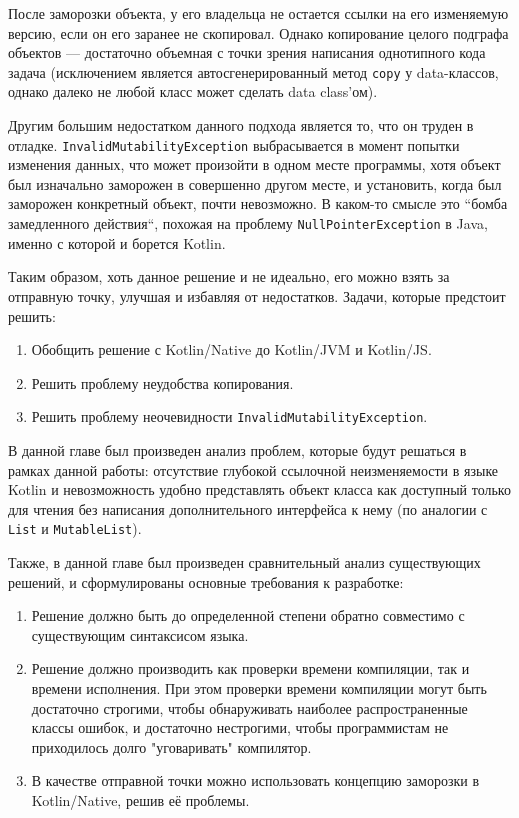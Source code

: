 \documentclass[specification,annotation,times]{itmo-student-thesis}
\begin{document}
После заморозки объекта, у его владельца не остается ссылки на его изменяемую версию, если он его заранее не скопировал.
Однако копирование целого подграфа объектов –-- достаточно объемная с точки зрения написания однотипного кода задача (исключением является автосгенерированный метод \texttt{copy} у data-классов, однако далеко не любой класс может сделать data class'ом).

Другим большим недостатком данного подхода является то, что он труден в отладке. \texttt{InvalidMutabilityException} выбрасывается в момент попытки изменения данных, что может произойти в одном месте программы, хотя объект был изначально заморожен в совершенно другом месте, и установить, когда был заморожен конкретный объект, почти невозможно.
В каком-то смысле это ``бомба замедленного действия``, похожая на проблему \texttt{NullPointerException} в Java, именно с которой и борется Kotlin.

Таким образом, хоть данное решение и не идеально, его можно взять за отправную точку, улучшая и избавляя от недостатков. Задачи, которые предстоит решить:

\begin{enumerate}
	\item Обобщить решение с Kotlin/Native до Kotlin/JVM и Kotlin/JS.
	\item Решить проблему неудобства копирования.
	\item Решить проблему неочевидности \texttt{InvalidMutabilityException}.
\end{enumerate}


\startrelatedwork
\finishrelatedwork

\chapterconclusion

В данной главе был произведен анализ проблем, которые будут решаться в рамках данной работы: отсутствие глубокой ссылочной неизменяемости в языке Kotlin и невозможность удобно представлять объект класса как доступный только для чтения без написания дополнительного интерфейса к нему (по аналогии с \texttt{List} и \texttt{MutableList}).

Также, в данной главе был произведен сравнительный анализ существующих решений, и сформулированы основные требования к разработке:

\begin{enumerate}
	\item Решение должно быть до определенной степени обратно совместимо с существующим синтаксисом языка.
	\item Решение должно производить как проверки времени компиляции, так и времени исполнения. При этом проверки времени компиляции могут быть достаточно строгими, чтобы обнаруживать наиболее распространенные классы ошибок, и достаточно нестрогими, чтобы программистам не приходилось долго "уговаривать" компилятор.  %
	\item В качестве отправной точки можно использовать концепцию заморозки в Kotlin/Native, решив её проблемы.
\end{enumerate}
\end{document}
